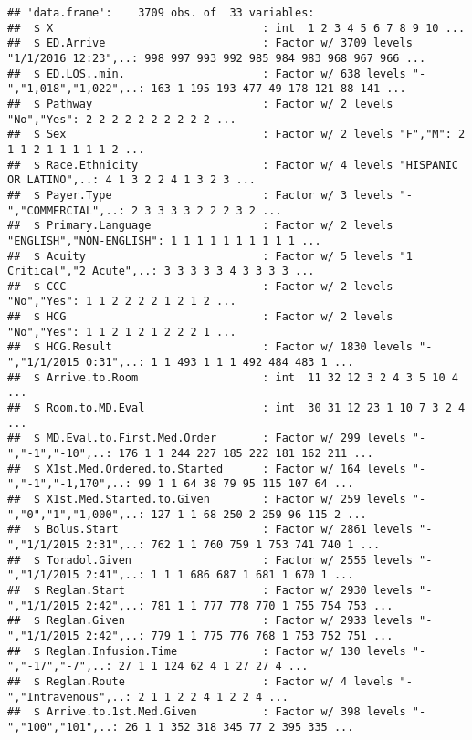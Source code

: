 \documentclass[]{article}
\begin{document}
\begin{verbatim}
## 'data.frame':    3709 obs. of  33 variables:
##  $ X                                : int  1 2 3 4 5 6 7 8 9 10 ...
##  $ ED.Arrive                        : Factor w/ 3709 levels "1/1/2016 12:23",..: 998 997 993 992 985 984 983 968 967 966 ...
##  $ ED.LOS..min.                     : Factor w/ 638 levels "-","1,018","1,022",..: 163 1 195 193 477 49 178 121 88 141 ...
##  $ Pathway                          : Factor w/ 2 levels "No","Yes": 2 2 2 2 2 2 2 2 2 2 ...
##  $ Sex                              : Factor w/ 2 levels "F","M": 2 1 1 2 1 1 1 1 1 2 ...
##  $ Race.Ethnicity                   : Factor w/ 4 levels "HISPANIC OR LATINO",..: 4 1 3 2 2 4 1 3 2 3 ...
##  $ Payer.Type                       : Factor w/ 3 levels "-","COMMERCIAL",..: 2 3 3 3 3 2 2 2 3 2 ...
##  $ Primary.Language                 : Factor w/ 2 levels "ENGLISH","NON-ENGLISH": 1 1 1 1 1 1 1 1 1 1 ...
##  $ Acuity                           : Factor w/ 5 levels "1 Critical","2 Acute",..: 3 3 3 3 3 4 3 3 3 3 ...
##  $ CCC                              : Factor w/ 2 levels "No","Yes": 1 1 2 2 2 2 1 2 1 2 ...
##  $ HCG                              : Factor w/ 2 levels "No","Yes": 1 1 2 1 2 1 2 2 2 1 ...
##  $ HCG.Result                       : Factor w/ 1830 levels "-","1/1/2015 0:31",..: 1 1 493 1 1 1 492 484 483 1 ...
##  $ Arrive.to.Room                   : int  11 32 12 3 2 4 3 5 10 4 ...
##  $ Room.to.MD.Eval                  : int  30 31 12 23 1 10 7 3 2 4 ...
##  $ MD.Eval.to.First.Med.Order       : Factor w/ 299 levels "-","-1","-10",..: 176 1 1 244 227 185 222 181 162 211 ...
##  $ X1st.Med.Ordered.to.Started      : Factor w/ 164 levels "-","-1","-1,170",..: 99 1 1 64 38 79 95 115 107 64 ...
##  $ X1st.Med.Started.to.Given        : Factor w/ 259 levels "-","0","1","1,000",..: 127 1 1 68 250 2 259 96 115 2 ...
##  $ Bolus.Start                      : Factor w/ 2861 levels "-","1/1/2015 2:31",..: 762 1 1 760 759 1 753 741 740 1 ...
##  $ Toradol.Given                    : Factor w/ 2555 levels "-","1/1/2015 2:41",..: 1 1 1 686 687 1 681 1 670 1 ...
##  $ Reglan.Start                     : Factor w/ 2930 levels "-","1/1/2015 2:42",..: 781 1 1 777 778 770 1 755 754 753 ...
##  $ Reglan.Given                     : Factor w/ 2933 levels "-","1/1/2015 2:42",..: 779 1 1 775 776 768 1 753 752 751 ...
##  $ Reglan.Infusion.Time             : Factor w/ 130 levels "-","-17","-7",..: 27 1 1 124 62 4 1 27 27 4 ...
##  $ Reglan.Route                     : Factor w/ 4 levels "-","Intravenous",..: 2 1 1 2 2 4 1 2 2 4 ...
##  $ Arrive.to.1st.Med.Given          : Factor w/ 398 levels "-","100","101",..: 26 1 1 352 318 345 77 2 395 335 ...

\end{verbatim}
\end{document}
